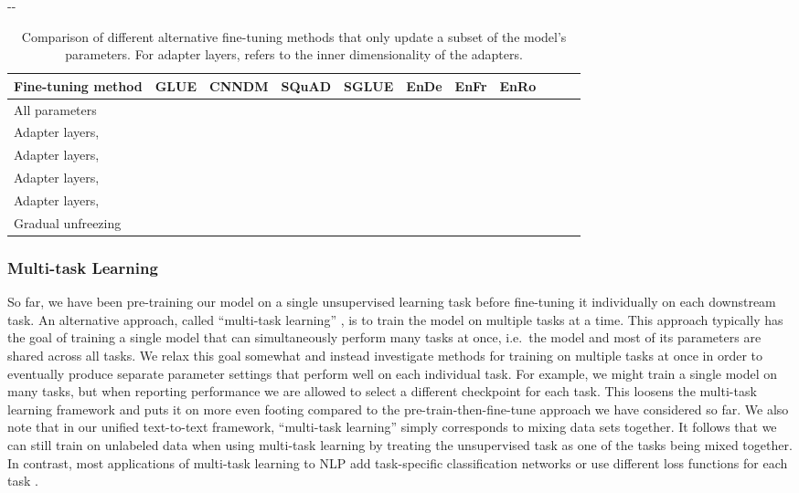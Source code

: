 \documentclass[twoside,11pt]{article}
\newlength{\offsetpage}
\newenvironment{widepage}{\begin{adjustwidth}{-\offsetpage}{-\offsetpage}\addtolength{\textwidth}{2\offsetpage}}{\end{adjustwidth}}
\newcommand{\bsl}{\makebox[0pt][r]{\raisebox{0.05em}{}}}
\begin{document}
\begin{table}
\footnotesize
\begin{widepage}
\centering
\begin{tabular}{l c c c c c c c c c c}
\toprule
    Fine-tuning method       & GLUE        & CNNDM       & SQuAD       & SGLUE       & EnDe        & EnFr        & EnRo    \\
\midrule
    \bsl All parameters      &  &  &  &  &  &  &  \\
    Adapter layers,     &  &  &  &  &  &  &  \\
    Adapter layers,    &  &  &  &  &  &  &  \\
    Adapter layers,    &  &  &  &  &  &  &  \\
    Adapter layers,   &  &  &  &  &  &  &  \\
    Gradual unfreezing       &  &  &  &  &  &  &  \\
\bottomrule
\end{tabular}
\end{widepage}
\caption{
Comparison of different alternative fine-tuning methods that only update a subset of the model's parameters.
For adapter layers,  refers to the inner dimensionality of the adapters.
}
\label{tab:finetuning}
\end{table}

\subsubsection{Multi-task Learning}
\label{sec:multitask}

So far, we have been pre-training our model on a single unsupervised learning task before fine-tuning it individually on each downstream task.
An alternative approach, called ``multi-task learning'' \citep{ruder2017overview,caruana1997multitask}, is to train the model on multiple tasks at a time.
This approach typically has the goal of training a single model that can simultaneously perform many tasks at once, i.e.\ the model and most of its parameters are shared across all tasks.
We relax this goal somewhat and instead investigate methods for training on multiple tasks at once in order to eventually produce separate parameter settings that perform well on each individual task.
For example, we might train a single model on many tasks, but when reporting performance we are allowed to select a different checkpoint for each task.
This loosens the multi-task learning framework and puts it on more even footing compared to the pre-train-then-fine-tune approach we have considered so far.
We also note that in our unified text-to-text framework, ``multi-task learning'' simply corresponds to mixing data sets together.
It follows that we can still train on unlabeled data when using multi-task learning by treating the unsupervised task as one of the tasks being mixed together.
In contrast, most applications of multi-task learning to NLP add task-specific classification networks or use different loss functions for each task \citep{liu2019multi}.
\end{document}
